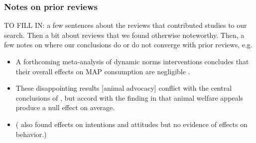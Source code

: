\documentclass[sn-nature,pdflatex]{sn-jnl}
\begin{document}
\subsubsection{Notes on prior reviews}\label{notes-on-prior-reviews}

TO FILL IN: a few sentences about the reviews that contributed studies
to our search. Then a bit about reviews that we found otherwise
noteworthy. Then, a few notes on where our conclusions do or do not
converge with prior reviews, e.g.

\begin{itemize}
\item
  A forthcoming meta-analysis of dynamic norms interventions concludes
  that their overall effects on MAP consumption are negligible
  \citep{Weikertova2024}.
\item
  These disappointing results {[}animal advocacy{]} conflict with the
  central conclusions of \citep{mathur2021effectiveness}, but accord
  with the finding in \citep{DiGennaro2024} that animal welfare appeals
  produce a null effect on average.
\item
  (\citep{bianchi2018conscious} also found effects on intentions and
  attitudes but no evidence of effects on behavior.)
\end{itemize}

\newpage

\renewcommand\refname{References}

\end{document}

